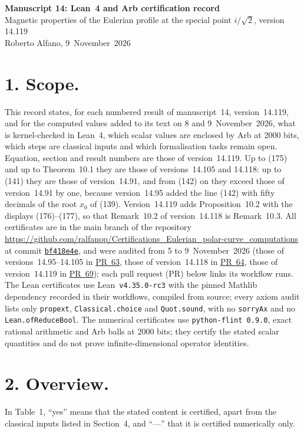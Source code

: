 \documentclass[11pt,a4paper]{article}
\newcommand{\R}{https://github.com/ralfanop/Certifications_Eulerian_polar-curve_computations}
\newcommand{\PR}[1]{\href{\R/pull/#1}{PR~#1}}
\newcommand{\eq}[1]{(#1)}
\begin{document}
\begin{center}
{\Large\bfseries Manuscript 14: Lean~4 and Arb certification record}\\[6pt]
{\large Magnetic properties of the Eulerian profile at the special point $i/\sqrt2$, version 14.119}\\[6pt]
Roberto Alfano, 9~November~2026
\end{center}

\section*{1. Scope.}
This record states, for each numbered result of manuscript~14, version~14.119, and for the computed values added to its text on 8 and 9~November~2026, what is kernel-checked in Lean~4, which scalar values are enclosed by Arb at 2000 bits, which steps are classical inputs and which formalisation tasks remain open. Equation, section and result numbers are those of version~14.119. Up to \eq{175} and up to Theorem~10.1 they are those of versions~14.105 and 14.118: up to \eq{141} they are those of version~14.91, and from \eq{142} on they exceed those of version~14.91 by one, because version~14.95 added the line \eq{142} with fifty decimals of the root $x_0$ of \eq{139}. Version~14.119 adds Proposition~10.2 with the displays \eq{176}--\eq{177}, so that Remark~10.2 of version~14.118 is Remark~10.3. All certificates are in the main branch of the repository \url{\R} at commit \href{\R/tree/bf418e4e708bdf6ec3d1498df57f4061a60415ae}{\texttt{bf418e4e}}, and were audited from 5 to 9~November~2026 (those of versions~14.95--14.105 in \PR{63}, those of version~14.118 in \PR{64}, those of version~14.119 in \PR{69}); each pull request (PR) below links its workflow runs. The Lean certificates use Lean~\texttt{v4.35.0-rc3} with the pinned Mathlib dependency recorded in their workflows, compiled from source; every axiom audit lists only \texttt{propext}, \texttt{Classical.choice} and \texttt{Quot.sound}, with no \texttt{sorryAx} and no \texttt{Lean.ofReduceBool}. The numerical certificates use \texttt{python-flint~0.9.0}, exact rational arithmetic and Arb balls at 2000 bits; they certify the stated scalar quantities and do not prove infinite-dimensional operator identities.

\section*{2. Overview.}
In Table~1, ``yes'' means that the stated content is certified, apart from the classical inputs listed in Section~4, and ``---'' that it is certified numerically only.
\end{document}
